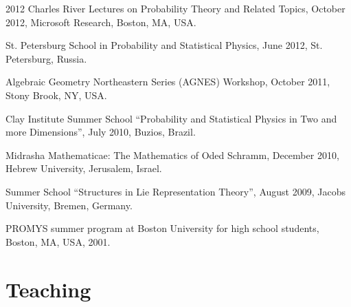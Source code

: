 \documentclass[letterpaper,11pt]{article}
\begin{document}
\begin{etaremune}
\item 2012 Charles River Lectures on Probability Theory and Related Topics, 
October 2012, Microsoft Research, Boston, MA, USA.

\item St. Petersburg School in Probability and Statistical Physics, June 2012, St. Petersburg, Russia.

\item Algebraic Geometry Northeastern Series (AGNES) Workshop, 
October 2011,
Stony Brook, NY, USA.

\item Clay Institute Summer School ``Probability and Statistical Physics in Two and more Dimensions'', July 2010, Buzios, Brazil. 

\item Midrasha Mathematicae: The Mathematics of Oded Schramm, December 2010, Hebrew University, Jerusalem, Israel. 

\item Summer School ``Structures in Lie Representation Theory'', August 2009, Jacobs University, Bremen, Germany. 

\item PROMYS summer program at Boston University for high school students, Boston, MA, USA, 2001.
\end{etaremune}

\section*{Teaching}
\end{document}
